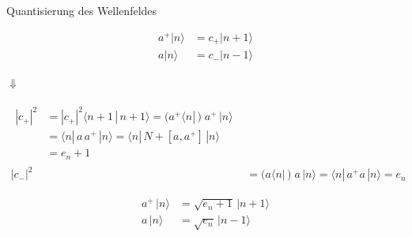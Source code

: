 \documentclass{beamer}
\begin{document}
\begin{frame}[t]{Quantisierung des Wellenfeldes}
	\vspace*{-0.5cm}
	\begin{center}
		\begin{minipage}{0.35\textwidth}
			\begin{align*}
			a^+|n\rangle &= c_+|n+1\rangle \\
			a|n\rangle &= c_-|n-1\rangle
			\end{align*}
		\end{minipage}
		
		\vspace*{0.5cm}
		$\Downarrow$
		
		\begin{minipage}{0.35\textwidth}
			\begin{align*}
			\begin{split}
			|c_+|^2 &= |c_+|^2 \langle n+1 \, | \, n+1 \rangle = ( a^+ \langle n |\,) \; a^+ \,| n \rangle \\
			&= \langle n |\, a \, a^+ \,|n \rangle = \langle n |\, N + [a,a^+] \,|n \rangle \\
			&= e_n+1
			\end{split}\\
			|c_-|^2 &= 	( a \langle n |\,) \; a \,| n \rangle = \langle n |\, a^+ a \,| n \rangle = e_n
			\end{align*}
		\end{minipage}
		\begin{minipage}{0.35\textwidth}
			\begin{align*}
			a^+\,|n\rangle &= \sqrt{e_n+1}\,|n+1\rangle \\
			a\,|n\rangle &= \sqrt{e_n}\,|n-1\rangle
			\end{align*}
		\end{minipage}
	\end{center}
\end{frame}
\end{document}
